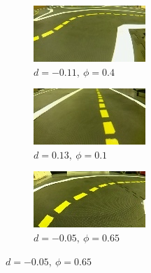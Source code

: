 \documentclass[11pt,letterpaper]{article}
\begin{document}
\begin{figure}[h!]
\begin{subfigure}[b]{0.24\linewidth}
 	\end{subfigure}
 	\begin{subfigure}[b]{0.24\linewidth}
 		\includegraphics[width=\linewidth]{00504.jpg}
 		\caption{$d=-0.11,\ \phi=0.4$}
 	\end{subfigure}
 	\begin{subfigure}[b]{0.24\linewidth}
 		\includegraphics[width=\linewidth]{00653.jpg}
 		\caption{$d=0.13,\ \phi=0.1$}
 	\end{subfigure}
 	\begin{subfigure}[b]{0.24\linewidth}
 		\includegraphics[width=\linewidth]{05842.jpg}
 		\caption{$d=-0.05,\ \phi=0.65$}

\end{subfigure}
\end{figure}
\end{document}
